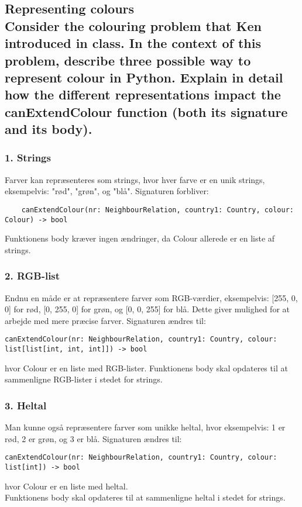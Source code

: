 \documentclass[a4paper,12pt]{article}
\begin{document}
\subsection{Representing colours\\
Consider the colouring problem that Ken introduced in class.
In the context of this problem, describe three possible way to represent colour in Python.
Explain in detail how the different representations impact the canExtendColour function (both its signature and its body).}

\subsubsection*{1. Strings}
Farver kan repræsenteres som strings, hvor hver farve er en unik strings, eksempelvis: "rød", "grøn", og "blå".
Signaturen forbliver:
\begin{lstlisting}
    canExtendColour(nr: NeighbourRelation, country1: Country, colour: Colour) -> bool
\end{lstlisting}
Funktionens body kræver ingen ændringer, da Colour allerede er en liste af strings.

\subsubsection*{2. RGB-list}
Endnu en måde er at repræsentere farver som RGB-værdier, eksempelvis: [255, 0, 0] for rød, [0, 255, 0] for grøn, og [0, 0, 255] for blå. Dette giver mulighed for at arbejde med mere præcise farver.
Signaturen ændres til:
\begin{lstlisting}
canExtendColour(nr: NeighbourRelation, country1: Country, colour: list[list[int, int, int]]) -> bool
\end{lstlisting}
hvor Colour er en liste med RGB-lister.
Funktionens body skal opdateres til at sammenligne RGB-lister i stedet for strings.

\subsubsection*{3. Heltal}
Man kunne også repræsentere farver som unikke heltal, hvor eksempelvis: 1 er rød, 2 er grøn, og 3 er blå.
Signaturen ændres til:
\begin{lstlisting}
canExtendColour(nr: NeighbourRelation, country1: Country, colour: list[int]) -> bool
\end{lstlisting}
hvor Colour er en liste med heltal.\\
Funktionens body skal opdateres til at sammenligne heltal i stedet for strings.
\end{document}

